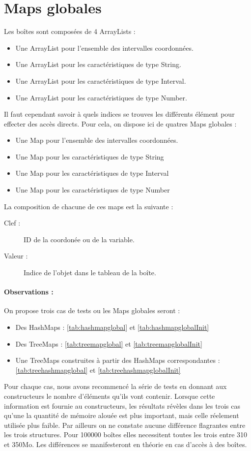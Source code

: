 \section{Maps globales}
Les boîtes sont composées  de 4 ArrayLists : 
\begin{itemize}
  \item Une ArrayList pour l'ensemble des intervalles coordonnées.
  \item Une ArrayList pour les caractéristiques de type String.
  \item Une ArrayList pour les caractéristiques de type Interval.
  \item Une ArrayList pour les caractéristiques de type Number.
\end{itemize}
Il faut cependant savoir à quels indices se trouves les différents élément pour effecter des accès directs. Pour cela, on dispose ici de quatres Maps globales :
\begin{itemize}
  \item Une Map pour l'ensemble des intervalles coordonnées.
  \item Une Map pour les caractéristiques de type String
  \item Une Map pour les caractéristiques de type Interval
  \item Une Map pour les caractéristiques de type Number
\end{itemize}
La composition de chacune de ces maps est la suivante :  
\begin{description}
 \item[Clef :]
ID de la coordonée ou de la variable.
\item[Valeur :]
Indice de l'objet dans le tableau de la boîte.
\end{description}


\paragraph{Observations :}
On propose trois cas de tests ou les Maps globales seront :
\begin{itemize}
  \item Des HashMaps :  \ref{tab:hashmapglobal} et \ref{tab:hashmapglobalInit}
  \item Des TreeMaps :  \ref{tab:treemapglobal} et \ref{tab:treemapglobalInit}
  \item Une TreeMaps construites à partir des HashMaps correspondantes : \ref{tab:treehashmapglobal} et \ref{tab:treehashmapglobalInit}
\end{itemize}
 Pour chaque cas, nous avons recommencé la série de tests en donnant aux constructeurs le nombre d'éléments qu'ils vont contenir. Lorsque cette information est fournie au constructeurs, les résultats révèles dans les trois cas qu'une  la quantité de mémoire alouée est plus important, mais celle réelement utilisée plus faible. Par ailleurs on ne constate aucune différence flagrantes entre les trois structures. Pour 100000 boîtes elles necessitent toutes les trois entre 310 et 350Mo. Les différences se manifesteront en théorie  en cas d'accès à des boîtes.
 
